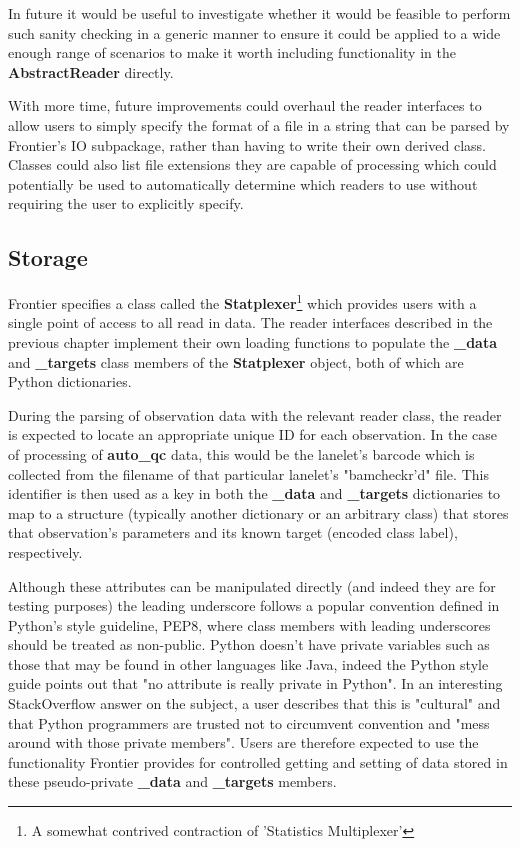 In future it would be useful to investigate whether it would be feasible to
perform such sanity checking in a generic manner to ensure it could be applied
to a wide enough range of scenarios to make it worth including functionality in
the \textbf{AbstractReader} directly.

With more time, future improvements could overhaul the reader interfaces
to allow users to simply specify the format of a file in a string that can be
parsed by Frontier's IO subpackage, rather than having to write their own derived
class. Classes could also list file extensions they are capable of processing
which could potentially be used to automatically determine which readers to use
without requiring the user to explicitly specify.


\subsection{Storage}

Frontier specifies a class called the \textbf{Statplexer}\footnote{A somewhat
contrived contraction of 'Statistics Multiplexer'} which provides users with a
single point of access to all read in data. The reader interfaces described in
the previous chapter implement their own loading functions to populate the
\textbf{\_data} and \textbf{\_targets} class members of the \textbf{Statplexer}
object, both of which are Python dictionaries.

During the parsing of observation data with the relevant reader class, the
reader is expected to locate an appropriate unique ID for each observation. In
the case of processing of \textbf{auto\_qc} data, this would be the lanelet's
barcode which is collected from the filename of that particular lanelet's
"bamcheckr'd" file.
This identifier is then used as a key in both the \textbf{\_data} and
\textbf{\_targets} dictionaries to map to a structure (typically another
dictionary or an arbitrary class) that stores that observation's parameters
and its known target (encoded class label), respectively.

Although these attributes can be manipulated directly (and indeed they are for
testing purposes) the leading underscore follows a popular convention defined in
Python's style guideline, PEP8\citep{pep8}, where class members with leading
underscores should be treated as non-public. Python doesn't have private
variables such as those that may be found in other languages like Java, indeed
the Python style guide points out that "no attribute is really private in
Python"\citep{pep8}. In an interesting StackOverflow answer on the subject, a
user describes that this is "cultural"\citep{so:pythonprivate} and that Python
programmers are trusted not to circumvent convention and "mess around with those
private members". Users are therefore expected to use the functionality
Frontier provides for controlled getting and setting of data stored in these
pseudo-private \textbf{\_data} and \textbf{\_targets} members.

